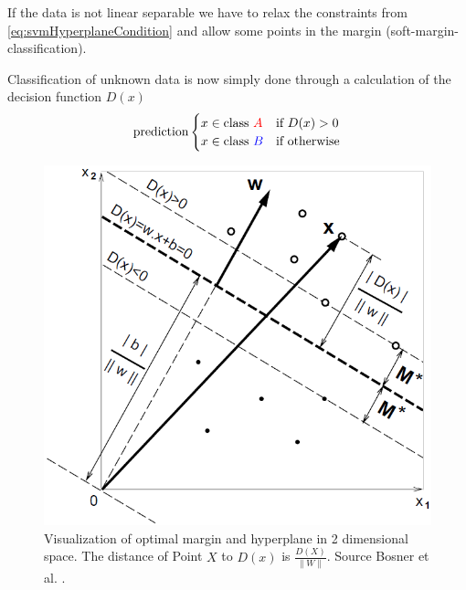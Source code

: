If the data is not linear separable we have to relax the constraints from \ref{eq:svmHyperplaneCondition} and allow some points in the margin {(soft-margin-classification)}. 

Classification of unknown data is now simply done through a calculation of the decision function $D(x)$
\begin{equation}
\text{prediction}
	\begin{cases}
	x \in \text{class } {\color{red}A} & \text{if } D(x) > 0 \\
	x \in \text{class } {\color{blue}B} & \text{if } \text{otherwise}
	\end{cases}	
\end{equation}

\begin{figure}[ht]
	\centering
	\includegraphics[scale=0.4]{figures/theorySVM_distanceToW}
	\caption{Visualization of optimal margin and hyperplane in 2 dimensional space. The distance of Point $X$ to $D(x)$ is $\frac{D(X)}{\|W\|}$. Source Bosner et al. \cite{Boser1992}.}
	\label{fig:svmHyperplaneDistance}
\end{figure}

